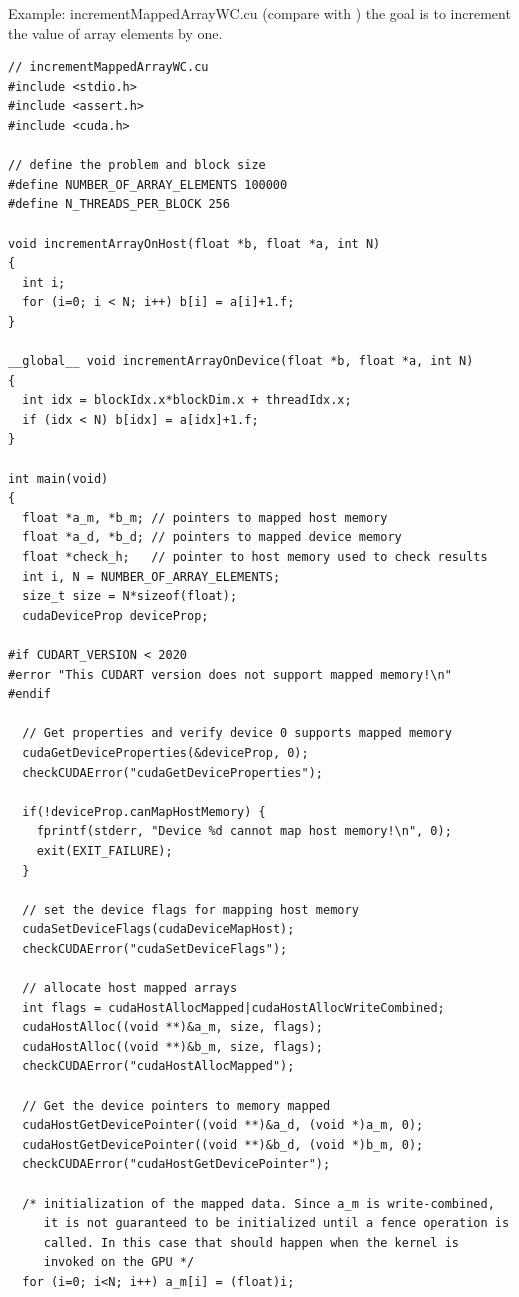 Example: incrementMappedArrayWC.cu (compare with ) the goal is to increment the
value of array elements by one.
\begin{lstlisting}
// incrementMappedArrayWC.cu
#include <stdio.h>
#include <assert.h>
#include <cuda.h>

// define the problem and block size
#define NUMBER_OF_ARRAY_ELEMENTS 100000
#define N_THREADS_PER_BLOCK 256

void incrementArrayOnHost(float *b, float *a, int N)
{
  int i;
  for (i=0; i < N; i++) b[i] = a[i]+1.f;
}

__global__ void incrementArrayOnDevice(float *b, float *a, int N)
{
  int idx = blockIdx.x*blockDim.x + threadIdx.x;
  if (idx < N) b[idx] = a[idx]+1.f;
}

int main(void)
{
  float *a_m, *b_m; // pointers to mapped host memory
  float *a_d, *b_d; // pointers to mapped device memory
  float *check_h;   // pointer to host memory used to check results
  int i, N = NUMBER_OF_ARRAY_ELEMENTS;
  size_t size = N*sizeof(float);
  cudaDeviceProp deviceProp;

#if CUDART_VERSION < 2020
#error "This CUDART version does not support mapped memory!\n"
#endif

  // Get properties and verify device 0 supports mapped memory
  cudaGetDeviceProperties(&deviceProp, 0);
  checkCUDAError("cudaGetDeviceProperties");

  if(!deviceProp.canMapHostMemory) {
    fprintf(stderr, "Device %d cannot map host memory!\n", 0);
    exit(EXIT_FAILURE);
  }

  // set the device flags for mapping host memory
  cudaSetDeviceFlags(cudaDeviceMapHost);
  checkCUDAError("cudaSetDeviceFlags");

  // allocate host mapped arrays
  int flags = cudaHostAllocMapped|cudaHostAllocWriteCombined;
  cudaHostAlloc((void **)&a_m, size, flags);
  cudaHostAlloc((void **)&b_m, size, flags);
  checkCUDAError("cudaHostAllocMapped");

  // Get the device pointers to memory mapped
  cudaHostGetDevicePointer((void **)&a_d, (void *)a_m, 0);
  cudaHostGetDevicePointer((void **)&b_d, (void *)b_m, 0);
  checkCUDAError("cudaHostGetDevicePointer");

  /* initialization of the mapped data. Since a_m is write-combined,
     it is not guaranteed to be initialized until a fence operation is
     called. In this case that should happen when the kernel is
     invoked on the GPU */
  for (i=0; i<N; i++) a_m[i] = (float)i;


\end{lstlisting}

